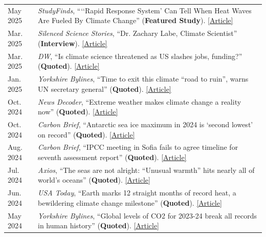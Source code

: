 \documentclass[margin,line,palatino,courier,10pt]{res}
\begin{document}
\begin{resume}
\begin{tabular}{@{}p{0.9in}p{4in}}
May 2025 & \textit{StudyFinds}, ```‘Rapid Response System' Can Tell When Heat Waves Are Fueled By Climate Change'' (\textbf{Featured Study}). \href{https://studyfinds.org/heat-wave-fueled-by-climate-change/}{[Article]}\\
Mar. 2025 & \textit{Silenced Science Stories}, ``Dr. Zachary Labe, Climate Scientist'' (\textbf{Interview}). \href{https://silencedsciencestories.com/f/dr-zachary-labe-climate-scientist}{[Article]}\\
Mar. 2025 & \textit{DW}, ``Is climate science threatened as US slashes jobs, funding?'' (\textbf{Quoted}). \href{https://www.dw.com/en/is-climate-science-threatened-as-us-slashes-jobs-funding/a-71859646}{[Article]}\\
Jan. 2025 & \textit{Yorkshire Bylines}, ``Time to exit this climate ``road to ruin'', warns UN secretary general'' (\textbf{Quoted}). \href{https://yorkshirebylines.co.uk/news/environment/time-to-exit-this-climate-road-to-ruin-warns-un-secretary-general/}{[Article]}\\
Oct. 2024 & \textit{News Decoder}, ``Extreme weather makes climate change a reality now'' (\textbf{Quoted}). \href{https://news-decoder.com/extreme-weather-makes-climate-change-a-reality-now/}{[Article]}\\
Oct. 2024 & \textit{Carbon Brief}, ``Antarctic sea ice maximum in 2024 is ‘second lowest’ on record'' (\textbf{Quoted}). \href{https://www.carbonbrief.org/antarctic-sea-ice-maximum-in-2024-is-second-lowest-on-record/}{[Article]}\\
Aug. 2024 & \textit{Carbon Brief}, ``IPCC meeting in Sofia fails to agree timeline for seventh assessment report'' (\textbf{Quoted}). \href{https://www.carbonbrief.org/ipcc-meeting-in-sofia-fails-to-agree-timeline-for-seventh-assessment-report/}{[Article]}\\
Jul. 2024 & \textit{Axios}, ``The seas are not alright: ``Unusual warmth'' hits nearly all of world's oceans'' (\textbf{Quoted}). \href{https://www.axios.com/2024/07/26/ocean-temperatures-extreme-heat-records}{[Article]}\\
Jun. 2024 & \textit{USA Today}, ``Earth marks 12 straight months of record heat, a bewildering climate change milestone'' (\textbf{Quoted}). \href{https://www.usatoday.com/story/news/weather/2024/06/05/global-heat-records-set-12-months-in-a-row-fueled-by-climate-change/73907161007/}{[Article]}\\
May 2024 & \textit{Yorkshire Bylines}, ``Global levels of CO2 for 2023-24 break all records in human history'' (\textbf{Quoted}). \href{https://yorkshirebylines.co.uk/news/environment/co2-levels-break-all-records-in-human-history/}{[Article]}\\

\end{tabular}
\end{resume}
\end{document}
